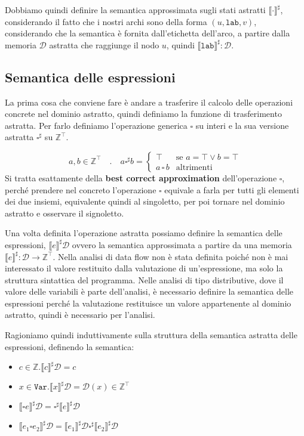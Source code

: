 Dobbiamo quindi definire la semantica approssimata sugli stati astratti
$\llbracket \cdot \rrbracket^\sharp$, considerando 
il fatto che i nostri archi sono della forma $(u, \texttt{lab}, v)$, considerando che la 
semantica è fornita dall'etichetta dell'arco, a partire dalla memoria $\mathcal{D}$ astratta 
che raggiunge il nodo $u$, quindi $\llbracket \texttt{lab} \rrbracket^\sharp : \mathcal{D}$. 
\subsection{Semantica delle espressioni} \label{sec:semantica-espressioni}
La prima cosa che conviene fare è andare a trasferire il calcolo delle operazioni concrete 
nel dominio astratto, quindi definiamo la funzione di trasferimento astratta.
Per farlo definiamo l'operazione generica $\square$ su interi e la sua versione astratta
$\square^\sharp$ su $\mathbb{Z}^\top$.

\[
  a,b \in \mathbb{Z}^\top \quad . \quad a \square^\sharp b =
  \begin{cases}
    \top & \text{se } a = \top \lor b = \top \\
    a\, \square\, b & \text{altrimenti}
  \end{cases}
\]
Si tratta esattamente della \textbf{best correct approximation} dell'operazione $\square$, 
perché prendere nel concreto l'operazione $\square$ equivale a farla per tutti gli elementi 
dei due insiemi, equivalente quindi al singoletto, per poi tornare nel dominio astratto 
e osservare il signoletto.

Una volta definita l'operazione astratta possiamo definire la semantica delle espressioni, 
$\llbracket e \rrbracket ^\sharp \mathcal{D}$ ovvero la semantica approssimata a partire da una memoria $\llbracket e \rrbracket^\sharp :
\mathcal{D} \to \mathbb{Z}^\top$. Nella analisi di data flow non è stata definita poiché 
non è mai interessato il valore restituito dalla valutazione di un'espressione, ma solo
la struttura sintattica del programma. Nelle analisi di tipo distributive, dove il valore delle 
variabili è parte dell'analisi, è necessario definire la semantica delle espressioni perché 
la valutazione restituisce un valore appartenente al dominio astratto, quindi è necessario
per l'analisi.

Ragioniamo quindi induttivamente sulla struttura della semantica 
astratta delle espressioni, definendo la semantica:
\begin{itemize}
  \item $c \in \mathbb{Z} . \llbracket c \rrbracket^\sharp \mathcal{D} = c$
  \item $x \in \texttt{Var} . \llbracket x \rrbracket^\sharp \mathcal{D} =
  \mathcal{D}(x) \in \mathbb{Z}^\top$
  \item $\llbracket \square e \rrbracket^\sharp \mathcal{D} =
  \square^\sharp \llbracket e \rrbracket^\sharp \mathcal{D}$
  \item $\llbracket e_1 \square e_2 \rrbracket^\sharp \mathcal{D} = 
  \llbracket e_1 \rrbracket^\sharp \mathcal{D} \square^\sharp \llbracket e_2 \rrbracket^\sharp \mathcal{D}$
\end{itemize}
